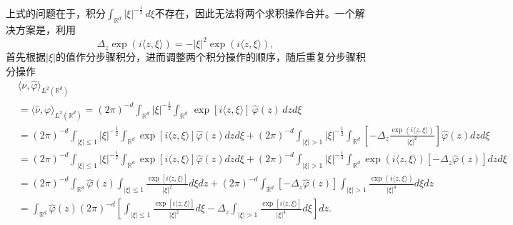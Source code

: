 上式的问题在于，积分$\int_{\mathbb{R}^d} \big| \xi \big|^{-\frac{1}{2}} \, d \xi$不存在，因此无法将两个求积操作合并。一个解决方案是，利用
\begin{equation*}
  \Delta_z \exp \left( i \langle z, \xi \rangle \right)
  = - |\xi|^{2} \exp \left( i \langle z, \xi \rangle \right),
\end{equation*}
首先根据$\big| \xi \big|$的值作分步骤积分，进而调整两个积分操作的顺序，随后重复分步骤积分操作
\begin{equation}
  \label{eq:bvp-laplace-fundamental-solution-inner-prod}
  \begin{split}
    &\langle \nu, \widehat{\varphi} \rangle_{L^{2}(\mathbb{R}^d)} \\
    &=\langle \widehat{\nu}, \varphi \rangle_{L^{2}(\mathbb{R}^{d})}
    = \left( 2 \pi \right)^{-d}
    \int_{\mathbb{R}^{d}} \big| \xi \big|^{-\frac{1}{2}}
    \int_{\mathbb{R}^{d}} \, \exp \left[ i \langle z, \xi \rangle \right] \,
    \widehat{\varphi}(z) \, dz
    d \xi \\
    & = \left( 2 \pi \right)^{-d}
    \int_{| \xi | \le 1} | \xi |^{-\frac{1}{2}}
    \int_{\mathbb{R}^{d}}  \exp \left[ i \langle z, \xi \rangle \right]
    \widehat{\varphi}(z)  dz
    d \xi
    + \left( 2 \pi \right)^{-d}
    \int_{| \xi | > 1} | \xi |^{-\frac{1}{2}}
    \int_{\mathbb{R}^{d}}
    \left[
    - \Delta_z \frac{
    \exp \left( i \langle z, \xi \rangle \right)
    }{
    | \xi |^2
    }
    \right]
    \widehat{\varphi}(z) dz
    d \xi \\
    & = \left( 2 \pi \right)^{-d}
    \int_{| \xi | \le 1} | \xi |^{-\frac{1}{2}}
    \int_{\mathbb{R}^{d}}  \exp \left[ i \langle z, \xi \rangle \right]
    \widehat{\varphi}(z)  dz
    d \xi
    + \left( 2 \pi \right)^{-d}
    \int_{| \xi | > 1} | \xi |^{-\frac{1}{4}}
    \int_{\mathbb{R}^{d}}
    \exp \left( i \langle z, \xi \rangle \right)
    \left[ - \Delta_z \widehat{\varphi}(z)\right]
    dz d \xi \\
    & = \left( 2 \pi \right)^{-d}
    \int_{\mathbb{R}^{d}} \widehat{\varphi}(z)
    \int_{| \xi | \le 1}  \frac{
    \exp \left[ i \langle z, \xi \rangle \right]
    }{
    | \xi |^{2}
    }
    d \xi dz
    + \left( 2 \pi \right)^{-d}
    \int_{\mathbb{R}^{d}}  \left[ - \Delta_z \widehat{\varphi}(z)\right]
    \int_{| \xi | > 1}
    \frac{
    \exp \left( i \langle z, \xi \rangle \right)
    }{
    | \xi |^{4}
    }
    d \xi dz \\
    &= \int_{\mathbb{R}^{d}}
    \widehat{\varphi}(z)
    \left( 2 \pi \right)^{-d}
    \left[
    \int_{|\xi| \le 1} \frac{
    \exp \left[ i \langle z, \xi \rangle \right]
    }{
    | \xi |^{2}
    } d \xi
    - \Delta_{z}
    \int_{|\xi| > 1}
    \frac{
    \exp \left[ i \langle z, \xi \rangle \right]
    }{
    | \xi |^{4}
    } d \xi
    \right]
    dz.
  \end{split}
\end{equation}

